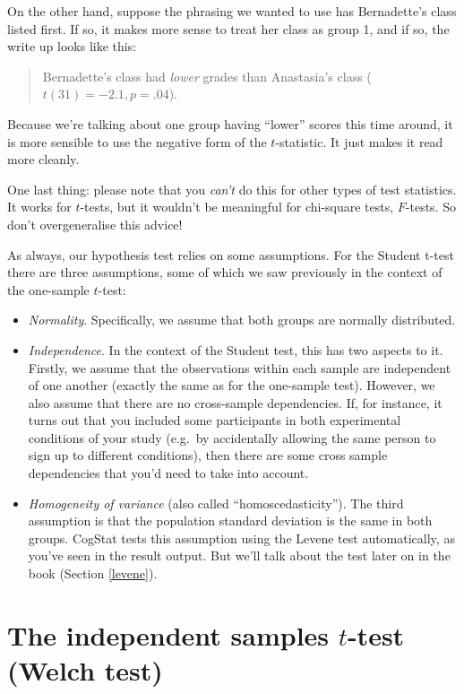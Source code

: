 \documentclass[
  11pt,
  a4paper,
  twoside,symmetric,openright]{book}
\providecommand{\tightlist}{%
  \setlength{\itemsep}{0pt}\setlength{\parskip}{0pt}}
\theoremstyle{break}
\theoremstyle{break}
\begin{document}
On the other hand, suppose the phrasing we wanted to use has Bernadette's class listed first. If so, it makes more sense to treat her class as group 1, and if so, the write up looks like this:

\begin{quote}
Bernadette's class had \emph{lower} grades than Anastasia's class (\(t(31)= -2.1, p=.04\)).
\end{quote}

Because we're talking about one group having ``lower'' scores this time around, it is more sensible to use the negative form of the \(t\)-statistic. It just makes it read more cleanly.

One last thing: please note that you \emph{can't} do this for other types of test statistics. It works for \(t\)-tests, but it wouldn't be meaningful for chi-square tests, \(F\)-tests. So don't overgeneralise this advice!

As always, our hypothesis test relies on some assumptions. For the Student t-test there are three assumptions, some of which we saw previously in the context of the one-sample \(t\)-test:

\begin{itemize}
\tightlist
\item
  \emph{Normality}. Specifically, we assume that both groups are normally distributed.
\item
  \emph{Independence}. In the context of the Student test, this has two aspects to it. Firstly, we assume that the observations within each sample are independent of one another (exactly the same as for the one-sample test). However, we also assume that there are no cross-sample dependencies. If, for instance, it turns out that you included some participants in both experimental conditions of your study (e.g.~by accidentally allowing the same person to sign up to different conditions), then there are some cross sample dependencies that you'd need to take into account.
\item
  \emph{Homogeneity of variance} (also called ``homoscedasticity''). The third assumption is that the population standard deviation is the same in both groups. CogStat tests this assumption using the Levene test automatically, as you've seen in the result output. But we'll talk about the test later on in the book (Section \ref{levene}).
\end{itemize}

\section{\texorpdfstring{The independent samples \(t\)-test (Welch test)}{The independent samples t-test (Welch test)}}\label{welchttest}
\end{document}
